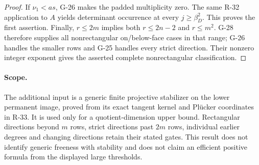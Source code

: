 \begin{proof}
If $\nu_1<as$, G-26 makes the padded multiplicity zero.
The same R-32 application to $A$ yields determinant
occurrence at every $j\ge\beta_D^2$. This proves the
first assertion. Finally, $r\le2m$ implies both
$r\le2n-2$ and $r\le m^2$. G-28 therefore supplies
all nonrectangular on/below-face cases in that range;
G-26 handles the smaller rows and G-25 handles every
strict direction. Their nonzero integer exponent gives
the asserted complete nonrectangular classification.
\end{proof}

\paragraph{Scope.}
The additional input is a generic finite projective
stabilizer on the lower permanent image, proved from its
exact tangent kernel and Pl\"ucker coordinates in R-33.
It is used only for a quotient-dimension upper bound.
Rectangular directions beyond $m$ rows, strict directions
past $2m$ rows, individual earlier degrees and changing
directions retain their stated gates. This result does
not identify generic freeness with stability and does
not claim an efficient positive formula from the displayed
large thresholds.

